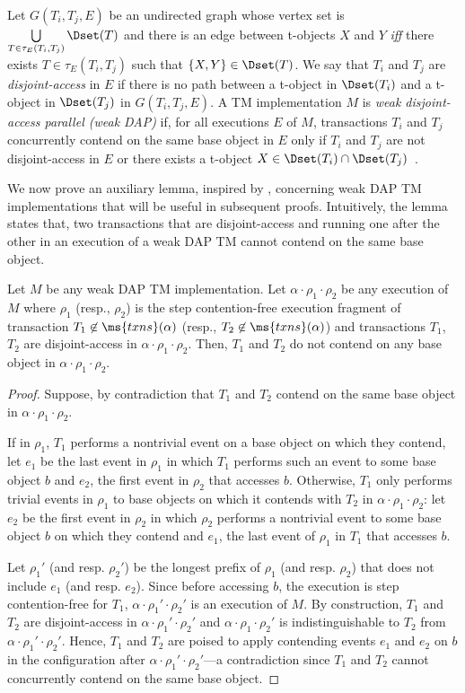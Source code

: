 Let $G(T_i,T_j,E)$ be an undirected graph whose vertex set is $\bigcup\limits_{T \in \tau_{E}(T_i,T_j)} \Dset(T)$
and there is an edge
between t-objects $X$ and $Y$ \emph{iff} there exists $T \in \tau_{E}(T_i,T_j)$ such that 
$\{X,Y\} \in \Dset(T)$.
We say that $T_i$ and $T_j$ are \emph{disjoint-access} in $E$
if there is no path between a t-object in $\Dset(T_i)$ and a t-object in $\Dset(T_j)$ in $G(T_i,T_j,E)$.
A TM implementation $M$ is \emph{weak disjoint-access parallel (weak DAP)} if, for
all executions $E$ of $M$,
transactions $T_i$ and $T_j$ 
concurrently contend on the same base object in $E$ only if   
$T_i$ and $T_j$ are not disjoint-access in $E$ or there exists a t-object $X \in \Dset(T_i) \cap \Dset(T_j)$~\cite{AHM09,PFK10}.

We now prove an auxiliary lemma, inspired by \cite{AHM09}, concerning weak DAP TM implementations 
that will be useful in subsequent proofs. Intuitively, the lemma states that, two transactions that are disjoint-access
and running one after the other in an execution of a weak DAP TM cannot contend on the same base object.
\begin{lemma}
\label{lm:dap}
Let $M $ be any weak DAP TM implementation.
Let $\alpha\cdot \rho_1 \cdot \rho_2$ be any execution of $M$ where
$\rho_1$ (resp., $\rho_2$) is the step contention-free
execution fragment of transaction $T_1 \not\in \ms{txns}(\alpha)$ (resp., $T_2 \not\in \ms{txns}(\alpha)$) 
and transactions $T_1$, $T_2$ are disjoint-access in $\alpha\cdot \rho_1 \cdot \rho_2$. 
Then, $T_1$ and $T_2$ do not contend on any base object in $\alpha\cdot \rho_1 \cdot \rho_2$.
\end{lemma}
\begin{proof}
Suppose, by contradiction that $T_1$ and $T_2$ contend on the same base object in $\alpha\cdot \rho_1\cdot \rho_2$.

If in $\rho_1$, $T_1$ performs a nontrivial event on a base object on which they contend, let $e_1$ be the last
event in $\rho_1$ in which $T_1$ performs such an event to some base object $b$ and $e_2$, the first event
in $\rho_2$ that accesses $b$.
Otherwise, $T_1$
only performs trivial events in $\rho_1$ to base objects on which it contends with $T_2$ in $\alpha\cdot \rho_1\cdot \rho_2$:
let $e_2$ be the first event in $\rho_2$ in which $\rho_2$ performs a nontrivial event to some base object $b$
on which they contend and $e_1$, the last event of $\rho_1$ in $T_1$ that accesses $b$.

Let $\rho_1'$ (and resp. $\rho_2'$) be the longest prefix of $\rho_1$ (and resp. $\rho_2$) that does not include
$e_1$ (and resp. $e_2$).
Since before accessing $b$, the execution is step contention-free for $T_1$, $\alpha \cdot
\rho_1'\cdot \rho_2'$ is an execution of $M$.
By construction, $T_1$ and $T_2$ are disjoint-access in $\alpha \cdot \rho_1'\cdot \rho_2'$
and $\alpha\cdot \rho_1 \cdot \rho_2'$ is indistinguishable to $T_2$ from $\alpha\cdot \rho_1' \cdot \rho_2'$.
Hence, $T_1$ and
$T_2$ are poised to apply contending events $e_1$ and $e_2$ on $b$ in the configuration after 
$\alpha\cdot \rho_1' \cdot \rho_2'$---a contradiction since $T_1$ and $T_2$ cannot concurrently contend on the same base object.   
\end{proof}
